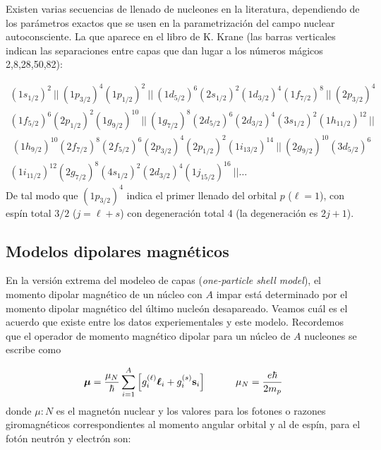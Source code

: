 Existen varias secuencias de llenado de nucleones en la literatura, dependiendo de los parámetros exactos que se usen en la parametrización del campo nuclear autoconsciente. La que aparece en el libro de K. Krane (las barras verticales indican las separaciones entre capas que dan lugar a los números mágicos 2,8,28,50,82):

\begin{equation}
	\begin{array}{l}(1s_{1/2})^2 \ || \ (1p_{3/2})^4 (1p_{1/2})^2 \ || \ (1d_{5/2})^6 (2s_{1/2})^2 (1d_{3/2})^4 (1f_{7/2})^8 \ || \ (2p_{3/2})^4 \\ (1f_{5/2})^6 (2p_{1/2})^2 (1g_{9/2})^{10} \ || \ (1g_{7/2})^8 (2d_{5/2})^6 (2d_{3/2})^4 (3s_{1/2})^2 (1h_{11/2})^{12}    \ || \\ \ (1h_{9/2})^{10} (2f_{7/2})^8 (2f_{5/2})^6 (2p_{3/2})^4 (2p_{1/2})^2  (1i_{13/2})^{14} \ || \ (2g_{9/2})^{10} (3d_{5/2})^6 \\ (1i_{11/2})^{12}    (2g_{7/2})^8 (4s_{1/2})^2 (2d_{3/2})^4  (1j_{15/2})^{16} \ ||		\ldots
	\end{array}
\end{equation}
De tal modo que $(1p_{3/2})^4$ indica el primer llenado del orbital $p$ ($\ell=1$), con espín total $3/2$ ($j=\ell + s$) con degeneración total 4 (la degeneración es $2j+1$). 



\subsection{Modelos dipolares magnéticos}

En la versión extrema del modeleo de capas (\textit{one-particle shell model}), el momento dipolar magnético de un núcleo con $A$ impar está determinado por el momento dipolar magnético del último nucleón desapareado. Veamos cuál es el acuerdo que existe entre los datos experiementales y este modelo. Recordemos que el operador de momento magnético dipolar para un núcleo de $A$ nucleones se escribe como

\begin{equation}
	\boldsymbol{\mu} = \frac{\mu_N}{\hbar} \sum_{i=1}^A \left[ g_i^{(\ell)} \boldsymbol{\ell}_i + g_i^{(s)}\mathbf{s}_i \right] \quad \quad \quad \mu_N = \frac{e\hbar}{2m_p}
\end{equation}
donde $\mu:N$ es el magnetón nuclear y los valores para los fotones o razones giromagnéticos correspondientes al momento angular orbital y al de espín, para el fotón neutrón y electrón son:

